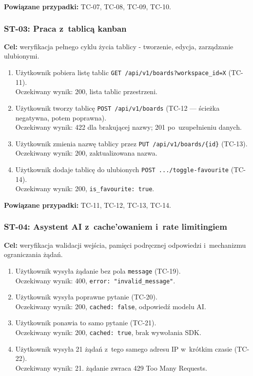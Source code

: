 \documentclass[12pt,a4paper]{article}
\begin{document}
\textbf{Powiązane przypadki:} TC-07, TC-08, TC-09, TC-10.

\subsubsection{ST-03: Praca z~tablicą kanban}

\textbf{Cel:} weryfikacja pełnego cyklu życia tablicy - tworzenie, edycja, zarządzanie ulubionymi.

\begin{enumerate}
  \item Użytkownik pobiera listę tablic \texttt{GET /api/v1/boards?workspace\_id=X} (TC-11). \\ Oczekiwany wynik: 200, lista tablic przestrzeni.
  \item Użytkownik tworzy tablicę \texttt{POST /api/v1/boards} (TC-12 --- ścieżka negatywna, potem poprawna). \\ Oczekiwany wynik: 422 dla brakującej nazwy; 201 po~uzupełnieniu danych.
  \item Użytkownik zmienia nazwę tablicy przez \texttt{PUT /api/v1/boards/\{id\}} (TC-13). \\ Oczekiwany wynik: 200, zaktualizowana nazwa.
  \item Użytkownik dodaje tablicę do ulubionych \texttt{POST .../toggle-favourite} (TC-14). \\ Oczekiwany wynik: 200, \texttt{is\_favourite: true}.
\end{enumerate}

\textbf{Powiązane przypadki:} TC-11, TC-12, TC-13, TC-14.

\subsubsection{ST-04: Asystent AI z~cache'owaniem i~rate limitingiem}

\textbf{Cel:} weryfikacja walidacji wejścia, pamięci podręcznej odpowiedzi i~mechanizmu ograniczania żądań.

\begin{enumerate}
  \item Użytkownik wysyła żądanie bez pola \texttt{message} (TC-19). \\ Oczekiwany wynik: 400, \texttt{error: "invalid\_message"}.
  \item Użytkownik wysyła poprawne pytanie (TC-20). \\ Oczekiwany wynik: 200, \texttt{cached: false}, odpowiedź modelu AI.
  \item Użytkownik ponawia to samo pytanie (TC-21). \\ Oczekiwany wynik: 200, \texttt{cached: true}, brak wywołania SDK.
  \item Użytkownik wysyła 21 żądań z~tego samego adresu IP w~krótkim czasie (TC-22). \\ Oczekiwany wynik: 21. żądanie zwraca 429 Too Many Requests.
\end{enumerate}
\end{document}
